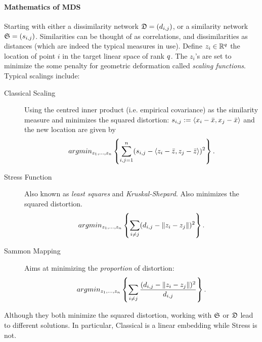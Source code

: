 \paragraph{Mathematics of MDS}
Starting with either a dissimilarity network $\mathfrak{D}=(d_{i,j})$, or a similarity network $\mathfrak{S}=(s_{i,j})$.
Similarities can be thought of as correlations, and dissimilarities as distances (which are indeed the typical measures in use).
Define $z_i \in \mathbb{R}^q$ the location of point $i$ in the target linear space of rank $q$. 
The $z_i$'s are set to minimize the some penalty for geometric deformation called \emph{scaling functions}.
Typical scalings include:
\begin{description}

\item[Classical Scaling] Using the centred inner product (i.e. empirical covariance) as the similarity measure and minimizes the squared distortion:
$s_{i,j}:= \left< x_i-\bar x,x_j-\bar{x} \right>$ and the new location are given by
\begin{align}
\label{eq:mds_classical}
	 argmin_{z_1,\dots,z_n}\left\{ \sum_{i,j=1}^{n} (s_{i,j}-\left< z_i-\bar z,z_j-\bar{z} \right> )^2 \right\}.
\end{align}

\item[Stress Function] Also known as \emph{least squares} and \emph{Kruskal-Shepard}. Also minimizes the squared distortion. 
\begin{align}
\label{eq:mds_stress}
	 argmin_{z_1,\dots,z_n}\left\{ \sum_{i \neq j} (d_{i,j}-\Vert z_i-z_j \Vert )^2 \right\}.
\end{align}

\item[Sammon Mapping] Aims at minimizing the \emph{proportion} of distortion:
\begin{align}
\label{eq:mds_sammon}
	 argmin_{z_1,\dots,z_n}\left\{ \sum_{i \neq j} \frac{(d_{i,j}-\Vert z_i-z_j \Vert )^2}{d_{i,j}} \right\}.
\end{align}

\end{description}



\begin{remark}
Although they both minimize the squared distortion, working with $\mathfrak{S}$ or $\mathfrak{D}$ lead to different solutions. 
In particular, Classical is a linear embedding while Stress is not. 
\end{remark}


